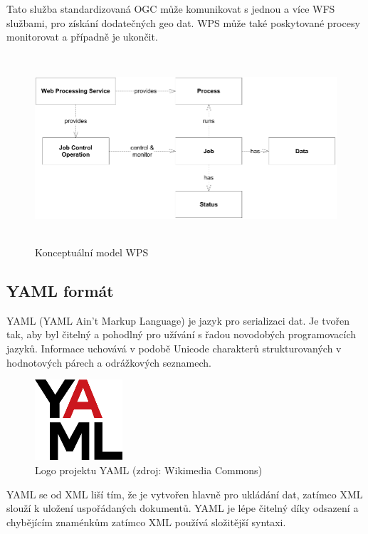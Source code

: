 \documentclass[a4paper,oneside,12pt]{book}
\begin{document}
\hspace{10mm}Tato služba standardizovaná OGC může komunikovat s jednou a více WFS službami, pro získání dodatečných geo dat. \cite{Stollberg2007} WPS může také poskytované procesy monitorovat a případně je ukončit. \cite{5Xjhvf3W3tsG6nhX} 

\begin{figure}[ht] \label{obr6}
\centering
\includegraphics[height=7cm]{pictures/WPS.png}
\caption{Konceptuální model WPS \cite{5Xjhvf3W3tsG6nhX}}
\label{fig:wps}
\end{figure}


\subsection{YAML formát} \label{yaml}



\hspace{10mm}YAML (YAML Ain’t Markup Language) je jazyk pro serializaci dat. Je tvořen tak, aby byl čitelný a pohodlný pro užívání s řadou novodobých programovacích jazyků. Informace uchovává v podobě Unicode charakterů strukturovaných v hodnotových párech a  odrážkových seznamech.  \cite{hsOq0virmVAO85Ud}
\begin{figure}[ht] \label{obr7}
\centering
\includegraphics[height=3cm]{pictures/yaml.png}
\caption{Logo projektu YAML  (zdroj: Wikimedia Commons)}
\label{fig:yaml}
\end{figure}

\hspace{10mm}YAML se od XML liší tím, že je vytvořen hlavně pro ukládání dat, zatímco XML slouží k uložení uspořádaných dokumentů. YAML je lépe čitelný díky odsazení a chybějícím znaménkům zatímco XML používá složitější syntaxi. \cite{hsOq0virmVAO85Ud}
\end{document}
